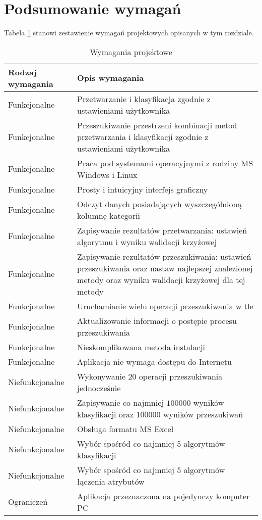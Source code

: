 \documentclass[../thesis.tex]{subfiles}
\begin{document}
\section{Podsumowanie wymagań}

Tabela \ref{req:table} stanowi zestawienie wymagań projektowych opisanych w tym rozdziale.

\begin{table}
\begin{center}
\caption{Wymagania projektowe}
\label{req:table}
\begin{tabular}{ | l | p{110mm} | }
\hline
Rodzaj wymagania & Opis wymagania \\ \hline
Funkcjonalne & Przetwarzanie i klasyfikacja zgodnie z ustawieniami użytkownika \\ \hline
Funkcjonalne & Przeszukiwanie przestrzeni kombinacji metod przetwarzania i klasyfikacji zgodnie z ustawieniami użytkownika \\ \hline
Funkcjonalne & Praca pod systemami operacyjnymi z rodziny MS Windows i Linux \\ \hline
Funkcjonalne & Prosty i intuicyjny interfejs graficzny \\ \hline
Funkcjonalne & Odczyt danych posiadających wyszczególnioną kolumnę kategorii \\ \hline
Funkcjonalne & Zapisywanie rezultatów przetwarzania: ustawień algorytmu i wyniku walidacji krzyżowej \\ \hline
Funkcjonalne & Zapisywanie rezultatów przeszukiwania: ustawień przeszukiwania oraz nastaw najlepszej znalezionej metody oraz wyniku walidacji krzyżowej dla tej metody \\ \hline
Funkcjonalne & Uruchamianie wielu operacji przeszukiwania w tle \\ \hline
Funkcjonalne & Aktualizowanie informacji o postępie procesu przeszukiwania \\ \hline
Funkcjonalne & Nieskomplikowana metoda instalacji \\ \hline
Funkcjonalne & Aplikacja nie wymaga dostępu do Internetu \\ \hline
Niefunkcjonalne & Wykonywanie 20 operacji przeszukiwania jednocześnie \\ \hline
Niefunkcjonalne & Zapisywanie co najmniej $100000$ wyników klasyfikacji oraz $100000$ wyników przeszukiwań \\ \hline
Niefunkcjonalne & Obsługa formatu MS Excel \\ \hline
Niefunkcjonalne & Wybór spośród co najmniej 5 algorytmów klasyfikacji \\ \hline
Niefunkcjonalne & Wybór spośród co najmniej 5 algorytmów łączenia atrybutów \\ \hline
Ograniczeń & Aplikacja przeznaczona na pojedynczy komputer PC \\ \hline

\end{tabular}
\end{center}
\end{table}
\end{document}

